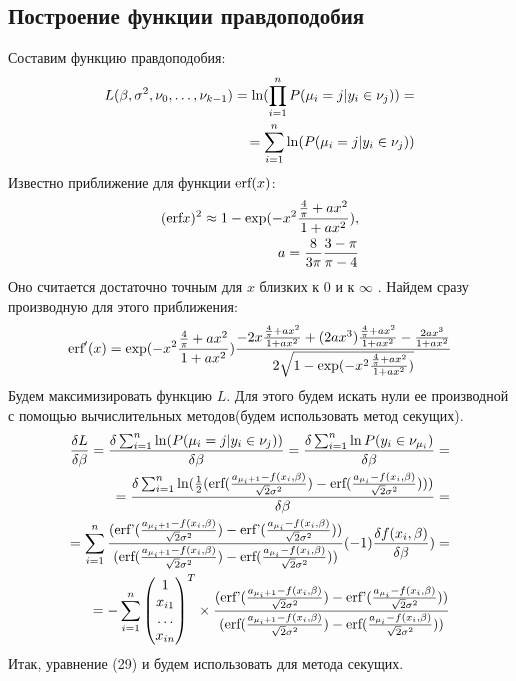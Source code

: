 \documentclass[12pt]{article}
\begin{document}
\subsection{Построение функции правдоподобия}
Составим функцию правдоподобия:
\begin{eqnarray}
    L(\beta,\sigma^2, \nu_0,\dots, \nu_{k-1})=\textup{ln}(\prod_{i=1}^{n}P(\mu_i=j|y_i\in \nu_j))=\\
    =\sum_{i=1}^{n}\ln(P(\mu_i=j|y_i\in \nu_j))
\end{eqnarray}
Известно приближение для функции $\textup{erf}(x)$:
\begin{eqnarray}
    (\textup{erf} x)^2\approx 1- \exp(-x^2 \frac{\frac{4}{\pi}+ax^2}{1+ax^2}),\\
    a=\frac{8}{3\pi}\frac{3-\pi}{\pi -4}
\end{eqnarray}
Оно считается достаточно точным для $x$ близких к $0$ и к $\infty$ \cite{Winitzki}. \hfill\break
Найдем сразу производную для этого приближения:
\begin{eqnarray}
    \textup{erf}'(x) = \exp(-x^2 \frac{\frac{4}{\pi}+ax^2}{1+ax^2}) \frac{-2x\frac{\frac{4}{\pi}+ax^2}{1+ax^2}+(2ax^3)\frac{\frac{4}{\pi}+ax^2}{1+ax^2}-\frac{2ax^3}{1+ax^2}}{2\sqrt{1- \exp(-x^2 \frac{\frac{4}{\pi}+ax^2}{1+ax^2})}}
\end{eqnarray}
Будем максимизировать функцию $L$.
Для этого будем искать нули ее производной с помощью вычислительных методов(будем использовать метод секущих).
\begin{eqnarray}
    \frac{\delta L}{\delta \beta}=\frac{\delta \sum_{i=1}^{n}\ln(P(\mu_i=j|y_i\in \nu_j))}{\delta \beta}=\frac{\delta \sum_{i=1}^{n}\ln P(y_i\in \nu_{\mu_i})}{\delta \beta}=\\
    =\frac{\delta \sum_{i=1}^{n} \ln(\frac{1}{2}(\textup{erf}(\frac{a_{\mu_i+1}-f(x_i,\beta)}{\sqrt{2}\sigma^2})-\textup{erf}(\frac{a_{\mu_i}-f(x_i,\beta)}{\sqrt{2}\sigma^2})) )         }{\delta \beta}=\\
    =  \sum_{i=1}^{n} \frac{(\textup{erf'}(\frac{a_{\mu_i+1}-f(x_i,\beta)}{\sqrt{2}\sigma^2})-\textup{erf'}(\frac{a_{\mu_i}-f(x_i,\beta)}{\sqrt{2}\sigma^2}))}{ (\textup{erf}(\frac{a_{\mu_i+1}-f(x_i,\beta)}{\sqrt{2}\sigma^2})-\textup{erf}(\frac{a_{\mu_i}-f(x_i,\beta)}{\sqrt{2}\sigma^2}))}  (-1) \frac{\delta f(x_i,\beta)}{\delta \beta} )=\\
    =-\sum_{i=1}^{n}\begin{pmatrix}
        1\\
        x_{i1}\\
        \dots\\
        x_{in}
    \end{pmatrix}^T\times  \frac{(\textup{erf'}(\frac{a_{\mu_i+1}-f(x_i,\beta)}{\sqrt{2}\sigma^2})-\textup{erf'}(\frac{a_{\mu_i}-f(x_i,\beta)}{\sqrt{2}\sigma^2}))}{ (\textup{erf}(\frac{a_{\mu_i+1}-f(x_i,\beta)}{\sqrt{2}\sigma^2})-\textup{erf}(\frac{a_{\mu_i}-f(x_i,\beta)}{\sqrt{2}\sigma^2}))}
\end{eqnarray}
Итак, уравнение (29) и будем использовать для метода секущих.
\end{document}
